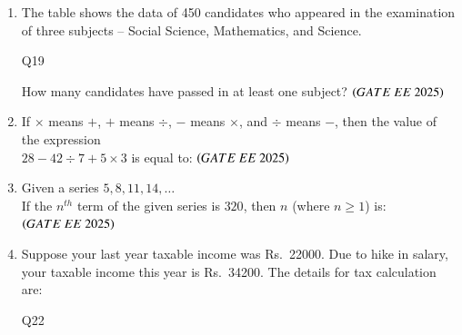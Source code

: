 \documentclass[journal,12pt,onecolumn]{IEEEtran}
\theoremstyle{remark}
\begin{document}
\begin{enumerate}
\item The table shows the data of 450 candidates who appeared in the examination of three subjects -- Social Science, Mathematics, and Science. 
\begin{table}[H]
\centering

\caption{Q19}
\label{Q19}
\end{table}
How many candidates have passed in at least one subject?
\hfill $\brak{GATE\ EE\ 2025}$
\begin{enumerate}
\end{enumerate}

\item If $\times$ means $+$, $+$ means $\div$, $-$ means $\times$, and $\div$ means $-$, then the value of the expression \\
$28 - 42 \div 7 + 5 \times 3$ is equal to:
\hfill $\brak{GATE\ EE\ 2025}$
\begin{enumerate}
\end{enumerate}

\item Given a series $5, 8, 11, 14, \dots$ \\
If the $n^{th}$ term of the given series is $320$, then $n$ (where $n \geq 1$) is:
\hfill $\brak{GATE\ EE\ 2025}$
\begin{enumerate}
\end{enumerate}

\item Suppose your last year taxable income was Rs.\ 22000. Due to hike in salary, your taxable income this year is Rs.\ 34200. The details for tax calculation are: \\
\begin{table}[H]
\centering

\caption{Q22}
\label{Q22}
\end{table}


\end{enumerate}
\end{document}
